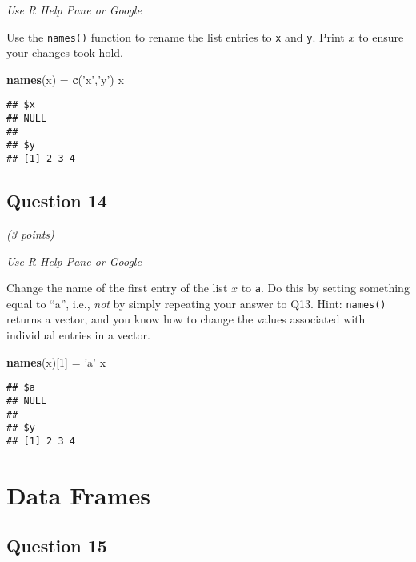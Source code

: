 \documentclass[
]{article}
\newenvironment{Shaded}{\begin{snugshade}}{\end{snugshade}}
\newcommand{\DecValTok}[1]{\textcolor[rgb]{0.00,0.00,0.81}{#1}}
\newcommand{\KeywordTok}[1]{\textcolor[rgb]{0.13,0.29,0.53}{\textbf{#1}}}
\newcommand{\NormalTok}[1]{#1}
\newcommand{\StringTok}[1]{\textcolor[rgb]{0.31,0.60,0.02}{#1}}
\begin{document}
\emph{Use R Help Pane or Google}

Use the \texttt{names()} function to rename the list entries to
\texttt{x} and \texttt{y}. Print \(x\) to ensure your changes took hold.

\begin{Shaded}
\begin{Highlighting}[]
\KeywordTok{names}\NormalTok{(x) =}\StringTok{ }\KeywordTok{c}\NormalTok{(}\StringTok{'x'}\NormalTok{,}\StringTok{'y'}\NormalTok{)}
\NormalTok{x}
\end{Highlighting}
\end{Shaded}

\begin{verbatim}
## $x
## NULL
## 
## $y
## [1] 2 3 4
\end{verbatim}

\hypertarget{question-14}{%
\subsection{Question 14}\label{question-14}}

\emph{(3 points)}

\emph{Use R Help Pane or Google}

Change the name of the first entry of the list \(x\) to \texttt{a}. Do
this by setting something equal to ``a'', i.e., \emph{not} by simply
repeating your answer to Q13. Hint: \texttt{names()} returns a vector,
and you know how to change the values associated with individual entries
in a vector.

\begin{Shaded}
\begin{Highlighting}[]
\KeywordTok{names}\NormalTok{(x)[}\DecValTok{1}\NormalTok{] =}\StringTok{ 'a'}
\NormalTok{x}
\end{Highlighting}
\end{Shaded}

\begin{verbatim}
## $a
## NULL
## 
## $y
## [1] 2 3 4
\end{verbatim}

\hypertarget{data-frames}{%
\section{Data Frames}\label{data-frames}}

\hypertarget{question-15}{%
\subsection{Question 15}\label{question-15}}
\end{document}
